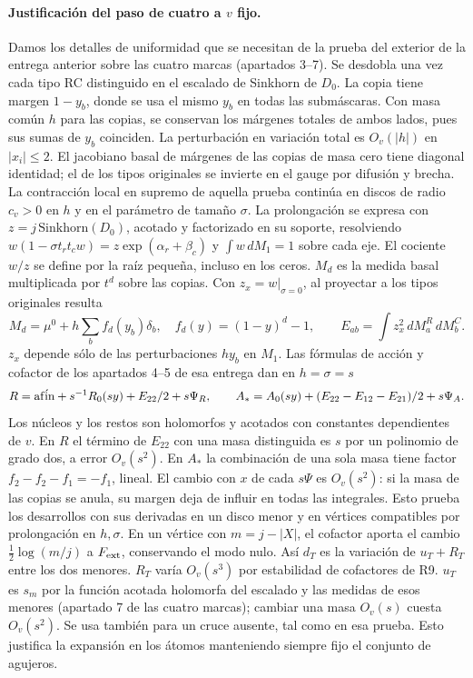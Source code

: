 \paragraph{Justificación del paso de cuatro a $v$ fijo.}
Damos los detalles de uniformidad que se necesitan de la prueba del exterior
de la entrega anterior sobre las cuatro marcas (apartados 3--7). Se desdobla
una vez cada tipo RC distinguido en el escalado de Sinkhorn de $D_0$. La copia
tiene margen $1-y_b$, donde se usa el mismo $y_b$ en todas las submáscaras.
Con masa común $h$ para las copias, se conservan los márgenes totales de ambos lados,
pues sus sumas de $y_b$ coinciden. La perturbación en variación total es
$O_v(|h|)$ en $|x_i|\le2$. El jacobiano basal de márgenes de las copias de masa
cero tiene diagonal identidad; el de los tipos originales se invierte en el gauge
por difusión y brecha. La contracción local en supremo de aquella prueba continúa
en discos de radio $c_v>0$ en $h$ y en el parámetro de tamaño $\sigma$.
La prolongación se expresa con $z=j\,\mathrm{Sinkhorn}(D_0)$, acotado y factorizado
en su soporte, resolviendo $w(1-\sigma t_rt_c w)=z\exp(\alpha_r+\beta_c)$ y
$\int w\,dM_1=1$ sobre cada eje. El cociente $w/z$ se define por la raíz pequeña,
incluso en los ceros. $M_d$ es la medida basal multiplicada por $t^d$ sobre las copias.
Con $z_x=w|_{\sigma=0}$, al proyectar a los tipos originales resulta
\[
 M_d=\mu^0+h\sum_b f_d(y_b)\delta_b,\quad f_d(y)=(1-y)^d-1,\qquad
 E_{ab}=\int z_x^2\,dM_a^R\,dM_b^C .
\]
$z_x$ depende sólo de las perturbaciones $hy_b$ en $M_1$.
Las fórmulas de acción y cofactor de los apartados 4--5 de esa entrega dan en $h=\sigma=s$
\[
 R={\rm af\acute in}+s^{-1}R_0(sy)+E_{22}/2+s\Psi_R,\qquad
 A_*=A_0(sy)+(E_{22}-E_{12}-E_{21})/2+s\Psi_A .
\]
Los núcleos y los restos son holomorfos y acotados con constantes dependientes de $v$.
En $R$ el término de $E_{22}$ con una masa distinguida es $s$ por un polinomio
de grado dos, a error $O_v(s^2)$. En $A_*$ la combinación de una sola masa tiene
factor $f_2-f_2-f_1=-f_1$, lineal. El cambio con $x$ de cada $s\Psi$ es $O_v(s^2)$:
si la masa de las copias se anula, su margen deja de influir en todas las integrales.
Esto prueba los desarrollos con sus derivadas en un disco menor y en vértices
compatibles por prolongación en $h,\sigma$. En un vértice con $m=j-|X|$,
el cofactor aporta el cambio $\frac12\log(m/j)$ a $F_{\rm ext}$, conservando
el modo nulo. Así $d_T$ es la variación de $u_T+R_T$ entre los dos menores.
$R_T$ varía $O_v(s^3)$ por estabilidad de cofactores de R9. $u_T$ es $s_m$
por la función acotada holomorfa del escalado y las medidas de esos menores
(apartado 7 de las cuatro marcas); cambiar una masa $O_v(s)$ cuesta $O_v(s^2)$.
Se usa también para un cruce ausente, tal como en esa prueba. Esto justifica la
expansión en los átomos manteniendo siempre fijo el conjunto de agujeros.
